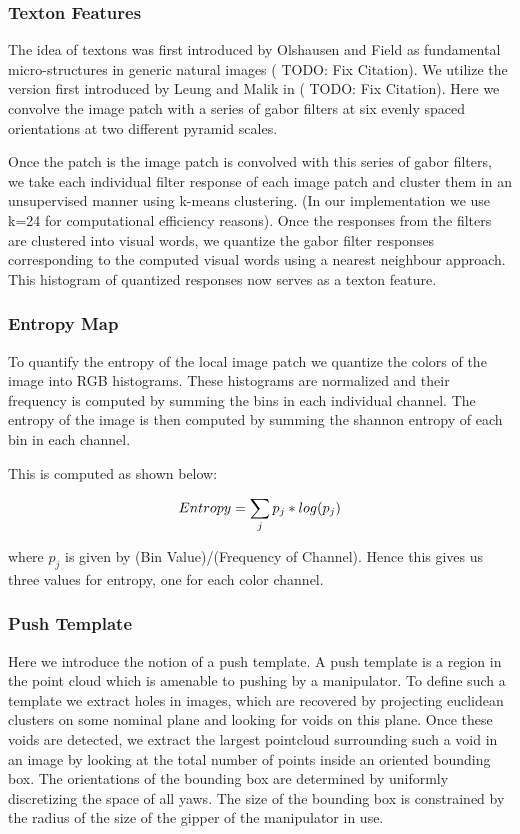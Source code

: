 \subsubsection{Texton Features}
The idea of textons was first introduced by Olshausen and Field as fundamental micro-structures in generic natural images (\cite{Javidi12_Journal} TODO: Fix Citation). We utilize the version first introduced by Leung and Malik in  (\cite{Javidi12_Journal} TODO: Fix Citation). Here we convolve the image patch with a series of gabor filters at six evenly spaced orientations at two different pyramid scales.

Once the patch is the image patch is convolved with this series of gabor filters, we take each individual filter response of each image patch and cluster them in an unsupervised manner using k-means clustering. (In our implementation we use k=24 for computational efficiency reasons). Once the responses from the filters are clustered into visual words, we quantize the gabor filter responses corresponding to the computed visual words using a nearest neighbour approach. This histogram of quantized responses now serves as a texton feature.

\subsubsection{Entropy Map}
To quantify the entropy of the local image patch we quantize the colors of the image into RGB histograms. These histograms are normalized and their frequency is computed by summing the bins in each individual channel. The entropy of the image is then computed by summing the shannon entropy of each bin in each channel.

This is computed as shown below:

\[
Entropy = \sum_jp_j*log(p_j)\\
\]

where $p_j$ is given by (Bin Value)/(Frequency of Channel). Hence this gives us three values for entropy, one for each color channel.

\subsubsection{Push Template}
Here we introduce the notion of a push template. A push template is a region in the point cloud which is amenable to pushing by a manipulator. To define such a template we extract holes in images, which are recovered by projecting euclidean clusters on some nominal plane and looking for voids on this plane. Once these voids are detected, we extract the largest pointcloud surrounding such a void in an image by looking at the total number of points inside an oriented bounding box. The orientations of the bounding box are determined by uniformly discretizing the space of all yaws. The size of the bounding box is constrained by the radius of the size of the gipper of the manipulator in use.

